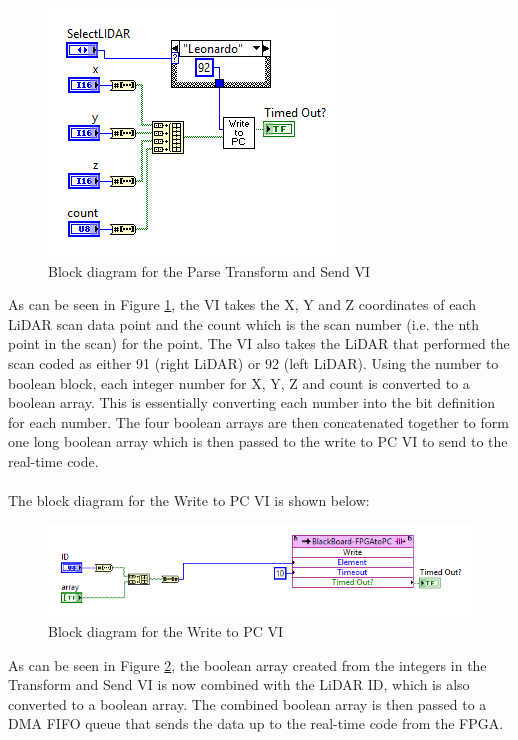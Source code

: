 \newpage

\begin{figure}[h!]
\centering
\includegraphics[scale=0.75]{Photos/inttobool.png}
\caption{Block diagram for the Parse Transform and Send VI}
\label{fig:inttobool}
\end{figure}

\noindent As can be seen in Figure \ref{fig:inttobool}, the VI takes the X, Y and Z coordinates of each LiDAR scan data point and the count which is the scan number (i.e. the nth point in the scan) for the point. The VI also takes the LiDAR that performed the scan coded as either 91 (right LiDAR) or 92 (left LiDAR). Using the number to boolean block, each integer number for X, Y, Z and count is converted to a boolean array. This is essentially converting each number into the bit definition for each number. The four boolean arrays are then concatenated together to form one long boolean array which is then passed to the write to PC VI to send to the real-time code.\\ \\
%
The block diagram for the Write to PC VI is shown below:

\begin{figure}[h!]
\centering
\includegraphics[scale=0.7]{Photos/sendtopc.png}
\caption{Block diagram for the Write to PC VI}
\label{fig:sendtopc}
\end{figure}

\noindent As can be seen in Figure \ref{fig:sendtopc}, the boolean array created from the integers in the Transform and Send VI is now combined with the LiDAR ID, which is also converted to a boolean array. The combined boolean array is then passed to a DMA FIFO queue that sends the data up to the real-time code from the FPGA.


